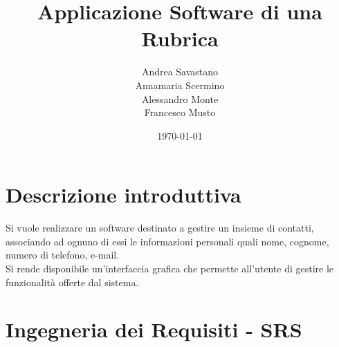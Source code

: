\documentclass[12pt, a4paper]{article}
\title{Applicazione Software di una Rubrica}
\author{Andrea Savastano 
	\\ Annamaria Scermino
	\\ Alessandro Monte 
	\\ Francesco Musto}
\date{\today}
\begin{document}
	\fancyhf{}
	\thispagestyle{fancy}
	
	\maketitle
	\newpage
	\tableofcontents 
	\listoffigures
	
	\newpage
	\section*{Descrizione introduttiva}
	Si vuole realizzare un software destinato a gestire un insieme di contatti, associando ad ognuno di essi le informazioni personali quali nome, cognome, numero di telefono, e-mail.
	\vspace{.2cm}\\Si rende disponibile un'interfaccia grafica che permette all'utente di gestire le funzionalità offerte dal sistema.
	
	\newpage
	\fancyhf{} %
	\fancyhead[L]{\nouppercase{\leftmark}} %
	\section{Ingegneria dei Requisiti - SRS}
	
	
	
\end{document}
